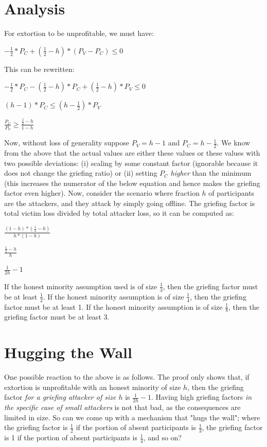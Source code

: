 \documentclass[12pt]{article}
\begin{document}
\section{Analysis}

For extortion to be unprofitable, we must have:

$-\frac{1}{2} * P_C + (\frac{1}{2} - h) * (P_V - P_C) \le 0$

This can be rewritten:

$-\frac{1}{2} * P_C - (\frac{1}{2} - h) * P_C + (\frac{1}{2} - h) * P_V \le 0$

$(h - 1) * P_C \le (h - \frac{1}{2}) * P_V$

$\frac{P_C}{P_V} \ge \frac{\frac{1}{2} - h}{1 - h}$

Now, without loss of generality suppose $P_V = h - 1$ and $P_C = h - \frac{1}{2}$. We know from the above that the actual values are either these values or these values with two possible deviations: (i) scaling by some constant factor (ignorable because it does not change the griefing ratio) or (ii) setting $P_C$ \textit{higher} than the minimum (this increases the numerator of the below equation and hence makes the griefing factor even higher). Now, consider the scenario where fraction $h$ of participants are the attackers, and they attack by simply going offline. The griefing factor is total victim loss divided by total attacker loss, so it can be computed as:

$\frac{(1 - h) * (\frac{1}{2} - h)}{h * (1 - h)}$

$\frac{\frac{1}{2} - h}{h}$

$\frac{1}{2h} - 1$

If the honest minority assumption used is of size $\frac{1}{3}$, then the griefing factor must be at least $\frac{1}{2}$. If the honest minority assumption is of size $\frac{1}{4}$, then the griefing factor must be at least 1. If the honest minority assumption is of size $\frac{1}{8}$, then the griefing factor must be at least 3.

\section{Hugging the Wall}

One possible reaction to the above is as follows. The proof only shows that, if extortion is unprofitable with an honest minority of size $h$, then the griefing factor \textit{for a griefing attacker of size $h$} is $\frac{1}{2h} - 1$. Having high griefing factors \textit{in the specific case of small attackers} is not that bad, as the consequences are limited in size. So can we come up with a mechanism that "hugs the wall"; where the griefing factor is $\frac{1}{2}$ if the portion of absent participants is $\frac{1}{3}$, the griefing factor is 1 if the portion of absent participants is $\frac{1}{4}$, and so on?
\end{document}
